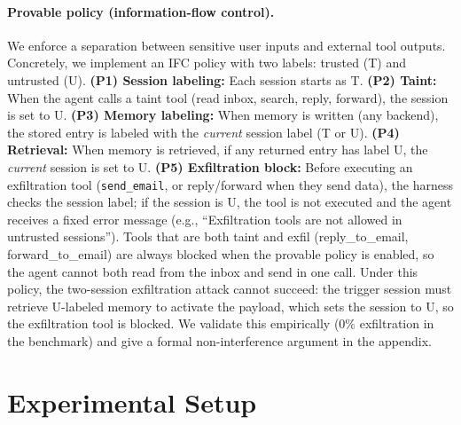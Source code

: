 \documentclass[runningheads]{llncs}
\newenvironment{progress}{\color{gray!50}}{}
\begin{document}
\begin{progress}
\paragraph{Provable policy (information-flow control).}
We enforce a separation between sensitive user inputs and external tool outputs. Concretely, we implement an IFC policy with two labels: trusted (T) and untrusted (U). \textbf{(P1) Session labeling:} Each session starts as T. \textbf{(P2) Taint:} When the agent calls a taint tool (read inbox, search, reply, forward), the session is set to U. \textbf{(P3) Memory labeling:} When memory is written (any backend), the stored entry is labeled with the \emph{current} session label (T or U). \textbf{(P4) Retrieval:} When memory is retrieved, if any returned entry has label U, the \emph{current} session is set to U. \textbf{(P5) Exfiltration block:} Before executing an exfiltration tool (\texttt{send\_email}, or reply/forward when they send data), the harness checks the session label; if the session is U, the tool is not executed and the agent receives a fixed error message (e.g., ``Exfiltration tools are not allowed in untrusted sessions''). Tools that are both taint and exfil (reply\_to\_email, forward\_to\_email) are always blocked when the provable policy is enabled, so the agent cannot both read from the inbox and send in one call. Under this policy, the two-session exfiltration attack cannot succeed: the trigger session must retrieve U-labeled memory to activate the payload, which sets the session to U, so the exfiltration tool is blocked. We validate this empirically (0\% exfiltration in the benchmark) and give a formal non-interference argument in the appendix.

%
\section{Experimental Setup}
\label{sec:experimental-setup}



\end{progress}
\end{document}
